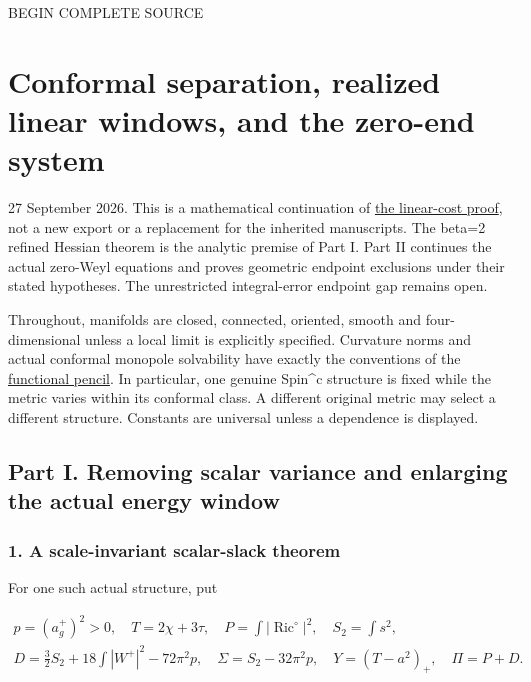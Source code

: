 \documentclass[
  10pt,
]{article}
\begin{document}
BEGIN COMPLETE SOURCE

\hypertarget{conformal-separation-realized-linear-windows-and-the-zero-end-system}{%
\section{Conformal separation, realized linear windows, and the zero-end
system}\label{conformal-separation-realized-linear-windows-and-the-zero-end-system}}

27 September 2026. This is a mathematical continuation of
\href{20260927_mixed_current_and_signed_cores.md}{the linear-cost
proof}, not a new export or a replacement for the inherited manuscripts.
The beta=2 refined Hessian theorem is the analytic premise of Part I.
Part II continues the actual zero-Weyl equations and proves geometric
endpoint exclusions under their stated hypotheses. The unrestricted
integral-error endpoint gap remains open.

Throughout, manifolds are closed, connected, oriented, smooth and
four-dimensional unless a local limit is explicitly specified. Curvature
norms and actual conformal monopole solvability have exactly the
conventions of the
\href{../mathematics/current/line1_functional_pencil.md}{functional
pencil}. In particular, one genuine Spin\^{}c structure is fixed while
the metric varies within its conformal class. A different original
metric may select a different structure. Constants are universal unless
a dependence is displayed.

\hypertarget{part-i.-removing-scalar-variance-and-enlarging-the-actual-energy-window}{%
\subsection{Part I. Removing scalar variance and enlarging the actual
energy
window}\label{part-i.-removing-scalar-variance-and-enlarging-the-actual-energy-window}}

\hypertarget{a-scale-invariant-scalar-slack-theorem}{%
\subsubsection{1. A scale-invariant scalar-slack
theorem}\label{a-scale-invariant-scalar-slack-theorem}}

For one such actual structure, put

\[
\begin{gathered}
 p=(a_g^+)^2>0,\quad T=2\chi+3\tau,\quad
 P=\int|\operatorname{Ric}^{\circ}|^2,\quad S_2=\int s^2,\\
 D=\frac32S_2+18\int|W^+|^2-72\pi^2p,\quad
 \Sigma=S_2-32\pi^2p,\quad Y=(T-a^2)_+,\quad \Pi=P+D.
\end{gathered}                                                     \tag{1.1}
\]
\end{document}
